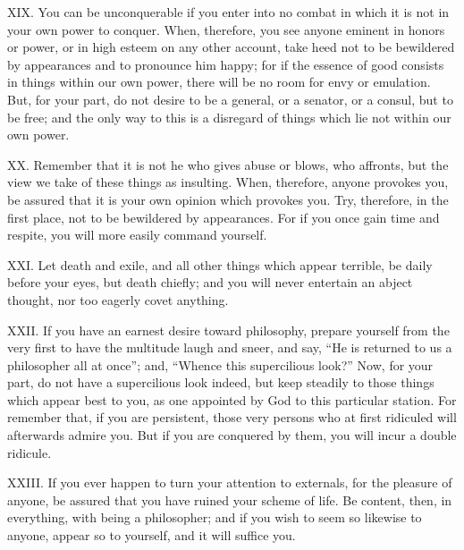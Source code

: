 \documentclass[a4paper]{article}
\begin{document}
XIX. You can be unconquerable if you enter into no combat in which it is not
in your own power to conquer. When, therefore, you see anyone eminent in
honors or power, or in high esteem on any other account, take heed not to
be bewildered by appearances and to pronounce him happy; for if the
essence of good consists in things within our own power, there will be no
room for envy or emulation. But, for your part, do not desire to be a
general, or a senator, or a consul, but to be free; and the only way to
this is a disregard of things which lie not within our own power.


XX. Remember that it is not he who gives abuse or blows, who affronts, but
the view we take of these things as insulting. When, therefore, anyone
provokes you, be assured that it is your own opinion which provokes you.
Try, therefore, in the first place, not to be bewildered by appearances.
For if you once gain time and respite, you will more easily command
yourself.


XXI. Let death and exile, and all other things which appear terrible, be daily
before your eyes, but death chiefly; and you will never entertain an
abject thought, nor too eagerly covet anything.


XXII. If you have an earnest desire toward philosophy, prepare yourself from
the very first to have the multitude laugh and sneer, and say, “He is
returned to us a philosopher all at once”; and, “Whence this supercilious
look?” Now, for your part, do not have a supercilious look indeed, but
keep steadily to those things which appear best to you, as one appointed
by God to this particular station. For remember that, if you are
persistent, those very persons who at first ridiculed will afterwards
admire you. But if you are conquered by them, you will incur a double
ridicule.


XXIII. If you ever happen to turn your attention to externals, for the pleasure
of anyone, be assured that you have ruined your scheme of life. Be
content, then, in everything, with being a philosopher; and if you wish
to seem so likewise to anyone, appear so to yourself, and it will suffice
you.
\end{document}
